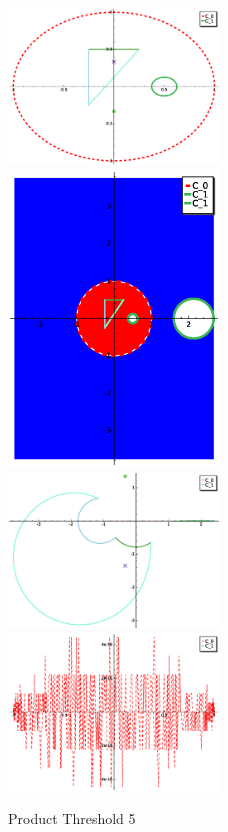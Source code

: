 \documentclass[a4paper,10pt]{article}
\begin{document}
\graphicspath{{./GE2LE1PT5/}}
\begin{figure}
\caption{Product Threshold 5}
\includegraphics[width=0.5\textwidth]{circle_plot.eps}
\includegraphics[width=0.5\textwidth]{Fundamental_domain.eps}
\includegraphics[width=0.5\textwidth]{zedplot.eps}
\includegraphics[width=0.5\textwidth]{zedplot_C0.eps}
\end{figure}
\end{document}
